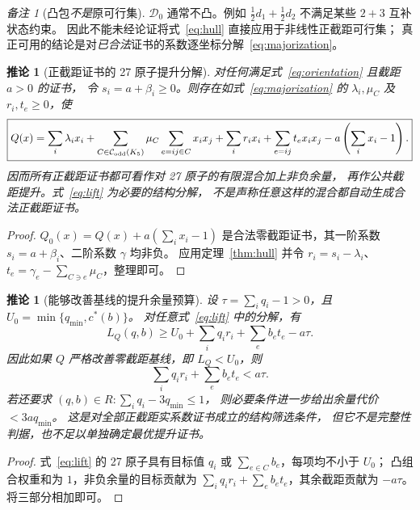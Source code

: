 \documentclass[11pt,a4paper]{ctexart}
\newtheorem{corollary}[theorem]{推论}
\theoremstyle{remark}
\newtheorem{remark}[theorem]{备注}
\newcommand{\CE}{\mathcal C_{\rm odd}(K_5)}
\begin{document}
\begin{remark}[凸包\emph{不是}原可行集]
$\mathcal D_0$ 通常不凸。例如 $\frac12d_1+\frac12d_2$
不满足某些 $2+3$ 互补状态约束。
因此不能未经论证将式~\eqref{eq:hull} 直接应用于非线性正截距可行集；
真正可用的结论是对\emph{已合法}证书的系数逐坐标分解~\eqref{eq:majorization}。
\end{remark}

\begin{corollary}[正截距证书的 27 原子提升分解]\label{cor:lift}
对任何满足式~\eqref{eq:orientation} 且截距 $a>0$ 的证书，
令 $s_i=a+\beta_i\ge0$。则存在如式~\eqref{eq:majorization} 的
$\lambda_i,\mu_C$ 及 $r_i,t_e\ge0$，使
\begin{equation}\label{eq:lift}
\boxed{
Q(x)=\sum_i\lambda_ix_i+
\sum_{C\in\CE}\mu_C\sum_{e=ij\in C}x_ix_j
+\sum_i r_ix_i+\sum_{e=ij}t_ex_ix_j
-a\left(\sum_i x_i-1\right).
}
\end{equation}
因而所有正截距证书都可看作对 27 原子的\emph{有限混合加上非负余量，
再作公共截距提升}。式~\eqref{eq:lift} 为必要的结构分解，
不是声称任意这样的混合都自动生成合法正截距证书。
\end{corollary}
\begin{proof}
$Q_0(x)=Q(x)+a(\sum_i x_i-1)$ 是合法零截距证书，其一阶系数
$s_i=a+\beta_i$、二阶系数 $\gamma$ 均非负。
应用定理~\ref{thm:hull} 并令 $r_i=s_i-\lambda_i$、
$t_e=\gamma_e-\sum_{C\ni e}\mu_C$，整理即可。
\end{proof}

\begin{corollary}[能够改善基线的提升余量预算]\label{cor:budget}
设 $\tau=\sum_iq_i-1>0$，且 $U_0=\min\{q_{\min},c^*(b)\}$。
对任意式~\eqref{eq:lift} 中的分解，有
\[
L_Q(q,b)\ge U_0+\sum_iq_ir_i+\sum_eb_et_e-a\tau.
\]
因此如果 $Q$ 严格改善零截距基线，即 $L_Q<U_0$，则
\begin{equation}\label{eq:budget}
\boxed{\sum_iq_ir_i+\sum_eb_et_e<a\tau.}
\end{equation}
若还要求 $(q,b)\in R:\sum_iq_i-3q_{\min}\le1$，
则必要条件进一步给出余量代价 $<3a q_{\min}$。
这是对\emph{全部}正截距实系数证书成立的结构筛选条件，
但它不是完整性判据，也不足以单独确定最优提升证书。
\end{corollary}
\begin{proof}
式~\eqref{eq:lift} 的 27 原子具有目标值
$q_i$ 或 $\sum_{e\in C}b_e$，每项均不小于 $U_0$；
凸组合权重和为 $1$，非负余量的目标贡献为
$\sum_iq_ir_i+\sum_eb_et_e$，其余截距贡献为 $-a\tau$。
将三部分相加即可。
\end{proof}
\end{document}
